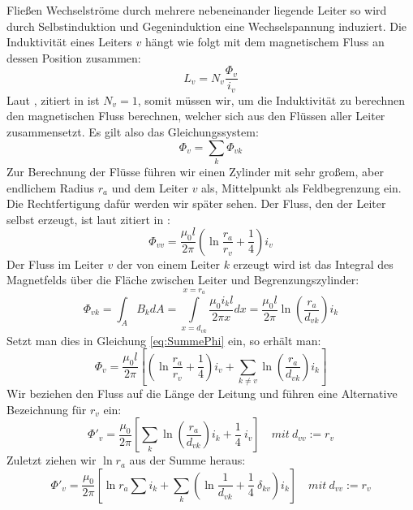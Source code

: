 Fließen Wechselströme durch mehrere nebeneinander liegende Leiter so wird durch Selbstinduktion und Gegeninduktion eine Wechselspannung induziert.
Die Induktivität eines Leiters $v$ hängt wie folgt mit dem magnetischem Fluss an dessen Position zusammen:
\begin{equation}
L_v = N_v \frac{\Phi_v}{i_v}
\end{equation}
Laut \cite{Moeller}, zitiert in \cite{Flosdorff}
ist $N_v = 1$, somit müssen wir, um die Induktivität zu berechnen den magnetischen Fluss berechnen, welcher sich aus den Flüssen aller Leiter zusammensetzt. Es gilt also das Gleichungssystem:
\begin{equation}\label{eq:SummePhi}
\Phi_v = \sum_k \Phi_{vk}
\end{equation}
Zur Berechnung der Flüsse führen wir einen Zylinder mit sehr großem, aber endlichem Radius $r_a$ und dem Leiter $v$ als, Mittelpunkt als Feldbegrenzung ein. Die Rechtfertigung dafür werden wir später sehen.
Der Fluss, den der Leiter selbst erzeugt, ist laut \cite{Moeller} zitiert in \cite{Flosdorff}:
\begin{equation}
\Phi_{vv} = \frac{\mu_0l}{2\pi} \left( \ln\frac{r_a}{r_v} + \frac{1}{4} \right) i_v
\end{equation}
Der Fluss im Leiter $v$ der von einem Leiter $k$ erzeugt wird ist das Integral des Magnetfelds über die Fläche zwischen Leiter und Begrenzungszylinder:
\begin{equation}
\Phi_{vk} = \int_A B_k dA = \int\limits_{x=d_{vk}}^{x=r_a} \frac{\mu_0i_k l}{2\pi x}dx =
\frac{\mu_0l}{2\pi}\ln\left(\frac{r_a}{d_{vk}}\right) i_k
\end{equation}
Setzt man dies in Gleichung \ref{eq:SummePhi} ein, so erhält man:
\begin{equation}
\Phi_v = \frac{\mu_0l}{2\pi} \left[ \left( \ln\frac{r_a}{r_v} +\frac{1}{4}\right) i_v + \sum_{k\neq v}\ln\left(\frac{r_a}{d_{vk}}\right) i_k \right]
\end{equation}
Wir beziehen den Fluss auf die Länge der Leitung und führen eine Alternative Bezeichnung für $r_v$ ein:
\begin{equation}
\Phi'_v = \frac{\mu_0}{2\pi}
 \left[
   \sum_k \ln\left(\frac{r_a}{d_{vk}}\right) i_k
   + \frac{1}{4} \: i_v
 \right]
\quad mit \: d_{vv}:=r_v
\end{equation}
Zuletzt ziehen wir $\ln r_a$ aus der Summe heraus:
\begin{equation}
\Phi'_v = \frac{\mu_0}{2\pi}
 \left[
   \ln r_a \sum i_k +
   \sum_k \left( \ln\frac{1}{d_{vk}} +
   \frac{1}{4} \: \delta_{kv} \right) i_k
 \right]
\quad mit \: d_{vv}:=r_v
\end{equation}
